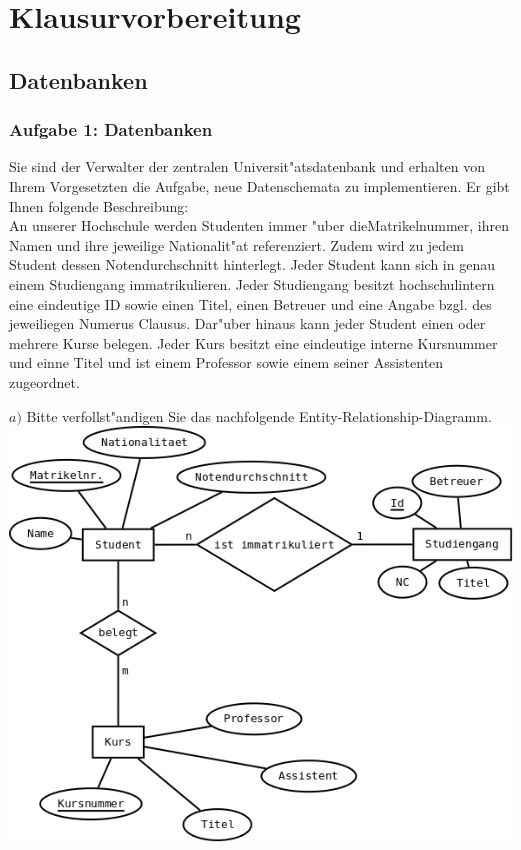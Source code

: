 
\chapter{Klausurvorbereitung}

\section{Datenbanken}

\subsection{Aufgabe 1: Datenbanken}
Sie sind der Verwalter der zentralen Universit"atsdatenbank und erhalten von Ihrem Vorgesetzten die Aufgabe, neue Datenschemata zu implementieren.
Er gibt Ihnen folgende Beschreibung:\\
An unserer Hochschule werden Studenten immer "uber dieMatrikelnummer, ihren Namen und ihre jeweilige Nationalit"at referenziert.
Zudem wird zu jedem Student dessen Notendurchschnitt hinterlegt.
Jeder Student kann sich in genau einem Studiengang immatrikulieren.
Jeder Studiengang besitzt hochschulintern eine eindeutige ID sowie einen Titel, einen Betreuer und eine Angabe bzgl. des jeweiliegen Numerus Clausus.
Dar"uber hinaus kann jeder Student einen oder mehrere Kurse belegen.
Jeder Kurs besitzt eine eindeutige interne Kursnummer und einne Titel und ist einem Professor sowie einem seiner Assistenten zugeordnet.

\noindent
$a)$ Bitte verfollst"andigen Sie das nachfolgende Entity-Relationship-Diagramm.\\

\includegraphics[scale=0.5]{./inc/klausurvorbereitung/klausurvorbereitung.png}
\bigskip

